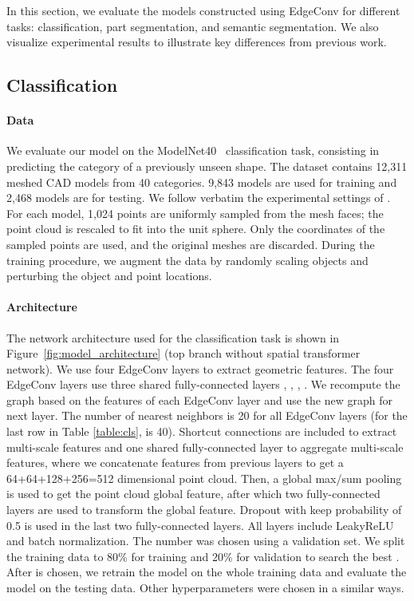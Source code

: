 \documentclass[acmtog]{acmart}
\begin{document}
In this section, we evaluate the models constructed using EdgeConv for different tasks: classification, part segmentation, and semantic segmentation. We also visualize experimental results to illustrate key differences from previous work. 

\subsection{Classification}
\label{sec:classification}
\paragraph{Data} We evaluate our model on the ModelNet40~\cite{wu20153d} classification task, consisting in predicting the category of a previously unseen shape. The dataset contains 12,311 meshed CAD models from 40 categories. 9,843 models are used for training and 2,468 models are for testing. We follow verbatim the experimental settings of  \citet{DBLP:journals/corr/QiSMG16}. For each model, 1,024 points are uniformly sampled from the mesh faces; the point cloud is rescaled to fit into the unit sphere. Only the  coordinates of the sampled points are used, and the original meshes are discarded. During the training procedure, we augment the data by randomly scaling objects and perturbing the object and point locations.

\paragraph{Architecture}
The network architecture used for the classification task is shown in Figure~\ref{fig:model_architecture} (top branch without spatial transformer network). 
We use four EdgeConv layers to extract geometric features. The four EdgeConv layers use three shared fully-connected layers , , , . We recompute the graph based on the features of each EdgeConv layer and use the new graph for next layer. The number  of nearest neighbors is 20 for all EdgeConv layers (for the last row in Table \ref{table:cls},  is 40).
Shortcut connections are included to extract multi-scale features and one shared fully-connected layer  to aggregate multi-scale features, where we concatenate features from previous layers to get a 64+64+128+256=512 dimensional point cloud. Then, a global max/sum pooling is used to get the point cloud global feature, after which two fully-connected layers  are used to transform the global feature. Dropout with keep probability of 0.5 is used in the last two fully-connected layers. All layers include LeakyReLU and batch normalization. The number  was chosen using a validation set. We split the training data to 80\% for training and 20\% for validation to search the best . After  is chosen, we retrain the model on the whole training data and evaluate the model on the testing data. Other hyperparameters were chosen in a similar ways.
\end{document}
